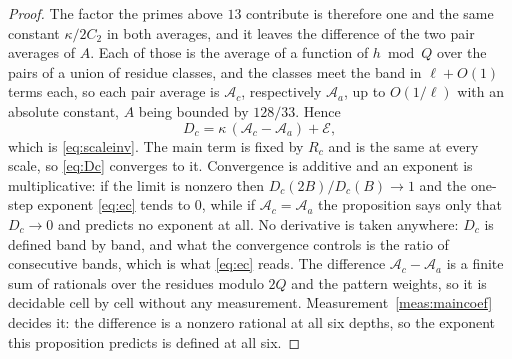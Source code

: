 \documentclass[11pt,a4paper]{article}
\theoremstyle{plain}
\theoremstyle{definition}
\theoremstyle{remark}
\begin{document}
\begin{proof}
The factor the primes above $13$ contribute is therefore one and the
same constant $\kappa/2C_2$ in both averages, and it leaves the
difference of the two pair averages of $A$. Each of those is the
average of a function of $h\bmod Q$ over the pairs of a union of
residue classes, and the classes meet the band in $\ell+O(1)$ terms
each, so each pair average is $\mathcal A_c$, respectively
$\mathcal A_a$, up to $O(1/\ell)$ with an absolute constant, $A$ being
bounded by $128/33$. Hence
\[
  D_c=\kappa\,(\mathcal A_c-\mathcal A_a)+\mathcal E,
\]
which is \eqref{eq:scaleinv}. The main term is fixed by $R_c$ and is
the same at every scale, so \eqref{eq:Dc} converges to it. Convergence
is additive and an exponent is multiplicative: if the limit is nonzero
then $D_c(2B)/D_c(B)\to1$ and the one-step exponent \eqref{eq:ec}
tends to $0$, while if $\mathcal A_c=\mathcal A_a$ the proposition
says only that $D_c\to0$ and predicts no exponent at all. No derivative
is taken anywhere: $D_c$ is defined band by band, and what the
convergence controls is the ratio of consecutive bands, which is what
\eqref{eq:ec} reads. The difference $\mathcal A_c-\mathcal A_a$ is a
finite sum of rationals over the residues modulo $2Q$ and the pattern
weights, so it is decidable cell by cell without any measurement.
Measurement~\ref{meas:maincoef} decides it: the difference is a
nonzero rational at all six depths, so the exponent this proposition
predicts is defined at all six.
\end{proof}
\end{document}
